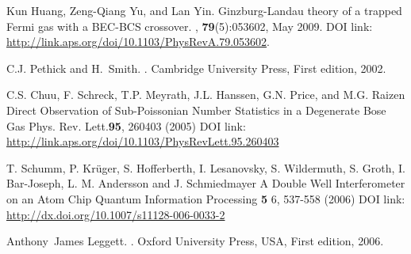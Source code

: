 \documentclass[a4paper,10pt]{article}
\begin{document}
\begin{thebibliography}{10}

Kun Huang, Zeng-Qiang Yu, and Lan Yin.
\newblock Ginzburg-{L}andau theory of a trapped {F}ermi gas with a {BEC}-{BCS}
  crossover.
, \textbf{79}(5):053602, May 2009.
\newblock DOI link: \url{http://link.aps.org/doi/10.1103/PhysRevA.79.053602}.



C.J. Pethick and H.~Smith.
.
\newblock Cambridge University Press, {F}irst edition, 2002.

C.S. Chuu, F. Schreck, T.P. Meyrath, J.L. Hanssen, G.N. Price, and M.G. Raizen
\newblock Direct Observation of Sub-Poissonian Number Statistics in a Degenerate Bose Gas 
\newblock Phys. Rev. Lett.{\bf 95}, 260403 (2005)
\newblock DOI link: \url{http://link.aps.org/doi/10.1103/PhysRevLett.95.260403}

T. Schumm, P. Kr\"uger, S. Hofferberth, I. Lesanovsky, S. Wildermuth, S. Groth, I. Bar-Joseph, L. M. Andersson and J. Schmiedmayer
\newblock A Double Well Interferometer on an Atom Chip
\newblock Quantum Information Processing {\bf 5} 6, 537-558 (2006)
\newblock DOI link: \url{http://dx.doi.org/10.1007/s11128-006-0033-2}


Anthony~James Leggett.
.
\newblock Oxford University Press, USA, {F}irst edition, 2006.


\end{thebibliography}
\end{document}
